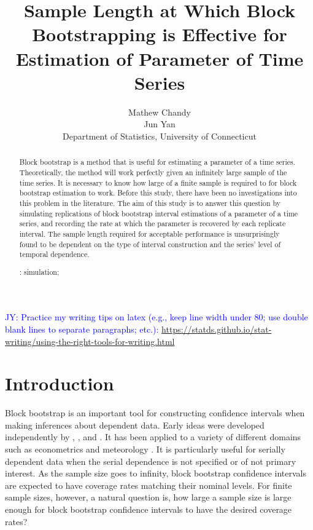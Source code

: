 \documentclass[12pt, letterpaper, titlepage]{article}
\title{Sample Length at Which Block Bootstrapping is Effective for Estimation of Parameter of Time Series}
\author{Mathew Chandy\\
  Jun Yan\\[1ex]
  Department of Statistics, University of Connecticut\\
}
\date{}
\newcommand{\jy}[1]{\textcolor{blue}{JY: #1}}
\begin{document}
 
\maketitle

\doublespace

\begin{abstract}
Block bootstrap is a method that is useful for estimating a parameter of a time
series. Theoretically, the method will work perfectly given an infinitely large sample of the time series.
It is necessary to know how large of a finite sample is required to for block bootstrap estimation to work. 
Before this study, there have been no investigations into this problem in the literature. The aim of this study 
is to answer this question by simulating replications of block bootstrap interval estimations of a parameter of a time series, 
and recording the rate at which the parameter is recovered by each replicate interval. 
The sample length required for acceptable performance is unsurprisingly found to be dependent 
on the type of interval construction and the series' level of temporal dependence.


\bigskip
\noindent{}:
simulation;
\end{abstract}


\jy{Practice my writing tips on latex (e.g., keep line width under 80; use
  double blank lines to separate paragraphs; etc.):
\url{https://statds.github.io/stat-writing/using-the-right-tools-for-writing.html}}

\section{Introduction}
\label{sec:intro}

Block bootstrap is an important tool for constructing confidence intervals when
making inferences about dependent data. Early ideas were developed independently
by \citet{hall1985resampling}, \citet{carlstein1986use}, and 
\citet{kunsch1989jackknife}. %
It has been applied to a variety of different domains such 
as econometrics \citep{mackinnon2006bootstrap} and meteorology
\citep{varga2017generalised}. It is particularly useful for serially dependent
data when the serial dependence is not specified or of not primary interest.
As the sample size goes to infinity, block bootstrap confidence intervals are
expected to have coverage rates matching their nominal levels. For finite sample
sizes, however, a natural question is, how large a sample size is large enough
for block bootstrap confidence intervals to have the desired coverage rates?
\end{document}
